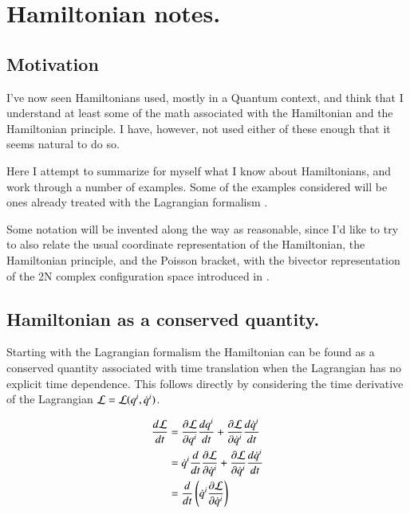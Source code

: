 

\chapter{Hamiltonian notes.}
\label{chap:hamiltonian}
{}
\date{Sept 26, 2009}

\beginArtWithToc

\section{Motivation}

I've now seen Hamiltonians used, mostly in a Quantum context, and think that I understand at least some of the math associated with the Hamiltonian and the Hamiltonian principle.  I have, however, not used either of these enough that it seems natural to do so.

Here I attempt to summarize for myself what I know about Hamiltonians, and work through a number of examples.  Some of the examples considered will be ones already treated with the Lagrangian formalism \cite{PJTongMf1}.

Some notation will be invented along the way as reasonable, since I'd like to try to also relate the usual coordinate representation of the Hamiltonian, the Hamiltonian principle, and the Poisson bracket, with the bivector representation of the 2N complex configuration space introduced in \cite{doran2003gap}.

\section{Hamiltonian as a conserved quantity.}

Starting with the Lagrangian formalism the Hamiltonian can be found as a conserved quantity associated with time translation when the Lagrangian has no explicit time dependence.  This follows directly by considering the time derivative of the Lagrangian $\mathcal{L} = \mathcal{L}(q^i, \dot{q}^i)$.

\begin{align*}
\frac{d\mathcal{L}}{dt} 
&= \frac{\partial {\mathcal{L}}}{\partial {q^i}} \frac{dq^i}{dt} +\frac{\partial {\mathcal{L}}}{\partial {\dot{q}^i}} \frac{d\dot{q}^i}{dt} \\
&= \dot{q}^i \frac{d}{dt}\frac{\partial {\mathcal{L}}}{\partial {\dot{q}^i}} +\frac{\partial {\mathcal{L}}}{\partial {\dot{q}^i}} \frac{d\dot{q}^i}{dt} \\
&= \frac{d}{dt} \left( \dot{q}^i \frac{\partial {\mathcal{L}}}{\partial {\dot{q}^i}} \right) 
\end{align*}

